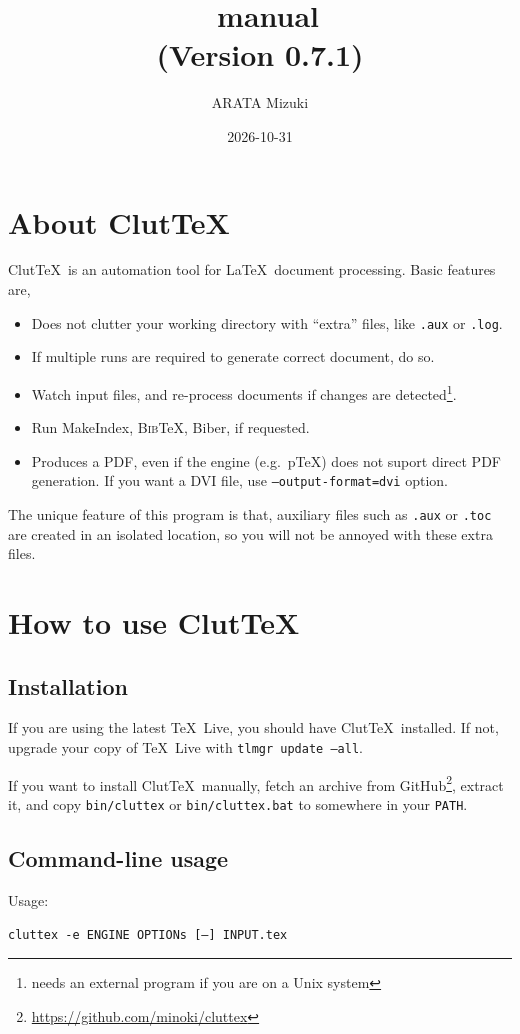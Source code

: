 \documentclass[a4paper]{report}
\title{\ClutTeX\ manual\\(Version 0.7.1)}
\author{ARATA Mizuki}
\date{2026-10-31}
\newcommand\ClutTeX{Clut\TeX}
\providecommand\BibTeX{\textsc{Bib}\TeX}
\newcommand\metavar[1]{\textnormal{\textsf{#1}}}
\begin{document}
\maketitle
\tableofcontents

\chapter{About \ClutTeX}
\ClutTeX\ is an automation tool for \LaTeX\ document processing.
Basic features are,
\begin{itemize}
\item Does not clutter your working directory with ``extra'' files, like \texttt{.aux} or \texttt{.log}.
\item If multiple runs are required to generate correct document, do so.
\item Watch input files, and re-process documents if changes are detected\footnote{needs an external program if you are on a Unix system}.
\item Run MakeIndex, \BibTeX, Biber, if requested.
\item Produces a PDF, even if the engine (e.g.\ p\TeX) does not suport direct PDF generation.
  If you want a DVI file, use \texttt{--output-format=dvi} option.
\end{itemize}

The unique feature of this program is that, auxiliary files such as \texttt{.aux} or \texttt{.toc} are created in an isolated location, so you will not be annoyed with these extra files.


\chapter{How to use \ClutTeX}
\section{Installation}
If you are using the latest \TeX\ Live, you should have \ClutTeX\ installed.
If not, upgrade your copy of \TeX\ Live with \texttt{tlmgr update --all}.

If you want to install \ClutTeX\ manually, fetch an archive from GitHub\footnote{\url{https://github.com/minoki/cluttex}}, extract it, and copy \texttt{bin/cluttex} or \texttt{bin/cluttex.bat} to somewhere in your \texttt{PATH}.

\section{Command-line usage}
Usage:
\begin{center}
  \texttt{cluttex -e \metavar{ENGINE} \metavar{OPTIONs} [--] \metavar{INPUT}.tex}
\end{center}
\end{document}

